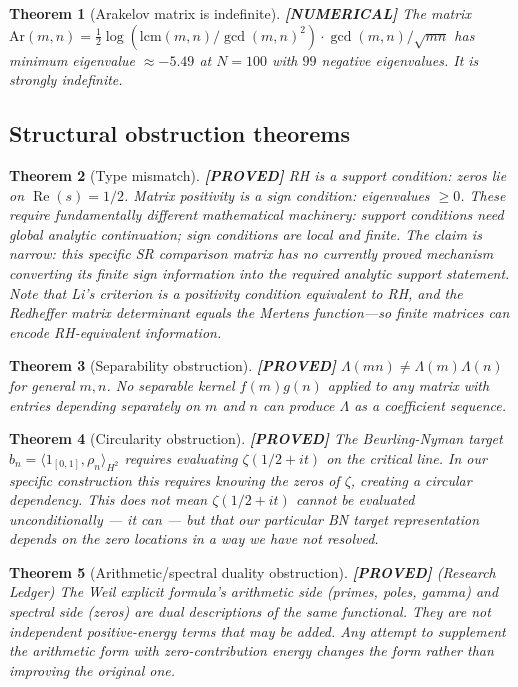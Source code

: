 \documentclass[11pt]{article}
\newtheorem{theorem}{Theorem}[section]
\theoremstyle{remark}
\newcommand{\PROVED}{\textbf{\color{blue}[PROVED]}}
\newcommand{\NUMERICAL}{\textbf{\color{orange}[NUMERICAL]}}
\DeclareRobustCommand{\_}{\ifmmode\text{\textunderscore}\else\textunderscore\allowbreak\fi}
\begin{document}
\begin{theorem}[Arakelov matrix is indefinite] \NUMERICAL{}
The matrix $\mathrm{Ar}(m,n) = \frac{1}{2}\log(\mathrm{lcm}(m,n)/\gcd(m,n)^2) \cdot \gcd(m,n)/\sqrt{mn}$
has minimum eigenvalue $\approx -5.49$ at $N=100$ with $99$ negative eigenvalues.
It is strongly indefinite.
\end{theorem}

\subsection{Structural obstruction theorems}

\begin{theorem}[Type mismatch] \PROVED{}
RH is a \emph{support condition}: zeros lie on $\operatorname{Re}(s) = 1/2$.
Matrix positivity is a \emph{sign condition}: eigenvalues $\geq 0$.
These require fundamentally different mathematical machinery:
support conditions need global analytic continuation;
sign conditions are local and finite.
The claim is narrow: this specific SR comparison matrix has no currently proved
mechanism converting its finite sign information into the required analytic support statement.
Note that Li's criterion is a positivity condition equivalent to RH, and the Redheffer matrix
determinant equals the Mertens function---so finite matrices can encode RH-equivalent information.
\end{theorem}

\begin{theorem}[Separability obstruction] \PROVED{}
$\Lambda(mn) \neq \Lambda(m)\Lambda(n)$ for general $m,n$.
No separable kernel $f(m)g(n)$ applied to any matrix with entries depending
separately on $m$ and $n$ can produce $\Lambda$ as a coefficient sequence.
\end{theorem}

\begin{theorem}[Circularity obstruction] \PROVED{}
The Beurling-Nyman target $b_n = \langle 1_{[0,1]}, \rho_n\rangle_{H^2}$ requires
evaluating $\zeta(1/2+it)$ on the critical line.
In our specific construction this requires knowing the zeros of $\zeta$,
creating a circular dependency. This does not mean $\zeta(1/2+it)$ cannot be
evaluated unconditionally --- it can --- but that our particular BN target
representation depends on the zero locations in a way we have not resolved.
\end{theorem}

\begin{theorem}[Arithmetic/spectral duality obstruction] \PROVED{} (Research Ledger)
The Weil explicit formula's arithmetic side (primes, poles, gamma) and spectral side (zeros)
are dual descriptions of the same functional. They are not independent positive-energy terms
that may be added. Any attempt to supplement the arithmetic form with zero-contribution
energy changes the form rather than improving the original one.
\end{theorem}
\end{document}
